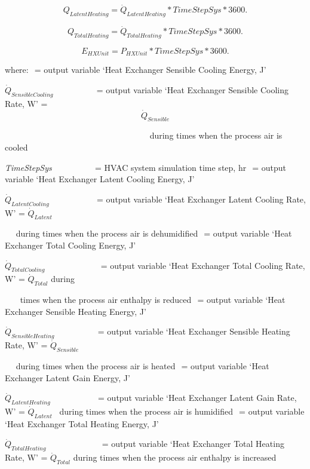 \begin{equation}
{Q_{LatentHeating}} = {\dot Q_{LatentHeating}}*TimeStepSys*3600.
\end{equation}

\begin{equation}
{Q_{TotalHeating}} = {\dot Q_{TotalHeating}}*TimeStepSys*3600.
\end{equation}

\begin{equation}
{E_{HXUnit}} = {P_{HXUnit}}*TimeStepSys*3600.
\end{equation}

where: \(_{ }\) = output variable `Heat Exchanger Sensible Cooling Energy, J'

\({\dot Q_{SensibleCooling}}\) ~~~~~~~~~ = output variable `Heat Exchanger Sensible Cooling Rate, W' = \[{\dot Q_{Sensible}}\]

~~~~~~~~~~~~~~~~~~~~~~~~~~~~~~~~~~ during times when the process air is cooled

\emph{TimeStepSys} ~~~~~~~~~ = HVAC system simulation time step, hr \(_{ }\) = output variable `Heat Exchanger Latent Cooling Energy, J'

\({\dot Q_{LatentCooling}}\) ~~~~~~~~~~ = output variable `Heat Exchanger Latent Cooling Rate, W' = \({\dot Q_{Latent}}\)

~~ during times when the process air is dehumidified \(_{ }\) = output variable `Heat Exchanger Total Cooling Energy, J'

\({\dot Q_{TotalCooling}}\) ~~~~~~~~~~~~ = output variable `Heat Exchanger Total Cooling Rate, W' = \({\dot Q_{Total}}\) during

~~~ times when the process air enthalpy is reduced \(_{ }\) = output variable `Heat Exchanger Sensible Heating Energy, J'

\({\dot Q_{SensibleHeating}}\) ~~~~~~~~~ = output variable `Heat Exchanger Sensible Heating Rate, W' = \({\dot Q_{Sensible}}\)

~~ during times when the process air is heated \(_{ }\) = output variable `Heat Exchanger Latent Gain Energy, J'

\({\dot Q_{LatentHeating}}\) ~~~~~~~~~~ = output variable `Heat Exchanger Latent Gain Rate, W' = \({\dot Q_{Latent}}\) ~during times when the process air is humidified \(_{ }\) = output variable `Heat Exchanger Total Heating Energy, J'

\({\dot Q_{TotalHeating}}\) ~~~~~~~~~~~~ = output variable `Heat Exchanger Total Heating Rate, W' = \({\dot Q_{Total}}\) during times when the process air enthalpy is increased

